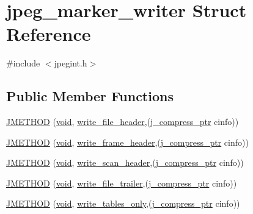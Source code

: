 \hypertarget{structjpeg__marker__writer}{}\section{jpeg\+\_\+marker\+\_\+writer Struct Reference}
\label{structjpeg__marker__writer}


{\ttfamily \#include $<$jpegint.\+h$>$}

\subsection*{Public Member Functions}
\begin{DoxyCompactItemize}
\item 
\hyperlink{structjpeg__marker__writer_ac5570409054c19f502583dff69fb8fab}{J\+M\+E\+T\+H\+O\+D} (\hyperlink{png_8h_aa8c59027f9ab2769342f248709d68d17}{void}, \hyperlink{jcmarker_8c_a0a1af4c95150b6cc958ce4a04580800d}{write\+\_\+file\+\_\+header},(\hyperlink{jpeglib_8h_add2a072c54e3a51550f4975f7ddb91e7}{j\+\_\+compress\+\_\+ptr} cinfo))
\item 
\hyperlink{structjpeg__marker__writer_a16553ec95a48ff5d49a1c698541eb859}{J\+M\+E\+T\+H\+O\+D} (\hyperlink{png_8h_aa8c59027f9ab2769342f248709d68d17}{void}, \hyperlink{jcmarker_8c_a3ca174ee750f1f7a7d703f49cece9734}{write\+\_\+frame\+\_\+header},(\hyperlink{jpeglib_8h_add2a072c54e3a51550f4975f7ddb91e7}{j\+\_\+compress\+\_\+ptr} cinfo))
\item 
\hyperlink{structjpeg__marker__writer_a696bbc698ad5760bbeb1614f9e6a7509}{J\+M\+E\+T\+H\+O\+D} (\hyperlink{png_8h_aa8c59027f9ab2769342f248709d68d17}{void}, \hyperlink{jcmarker_8c_ade06dd93aedf31146a4833c22b7bd57b}{write\+\_\+scan\+\_\+header},(\hyperlink{jpeglib_8h_add2a072c54e3a51550f4975f7ddb91e7}{j\+\_\+compress\+\_\+ptr} cinfo))
\item 
\hyperlink{structjpeg__marker__writer_affc544100d40a2c75c8e438569ea7844}{J\+M\+E\+T\+H\+O\+D} (\hyperlink{png_8h_aa8c59027f9ab2769342f248709d68d17}{void}, \hyperlink{jcmarker_8c_ab695fb3ccfb33e10a7d80689cd08d166}{write\+\_\+file\+\_\+trailer},(\hyperlink{jpeglib_8h_add2a072c54e3a51550f4975f7ddb91e7}{j\+\_\+compress\+\_\+ptr} cinfo))
\item 
\hyperlink{structjpeg__marker__writer_ac0791e1ab4eb10f20144a84a1f0371dc}{J\+M\+E\+T\+H\+O\+D} (\hyperlink{png_8h_aa8c59027f9ab2769342f248709d68d17}{void}, \hyperlink{jcmarker_8c_af5564bc6ecf1f982f588f18637c73906}{write\+\_\+tables\+\_\+only},(\hyperlink{jpeglib_8h_add2a072c54e3a51550f4975f7ddb91e7}{j\+\_\+compress\+\_\+ptr} cinfo))

\end{DoxyCompactItemize}
